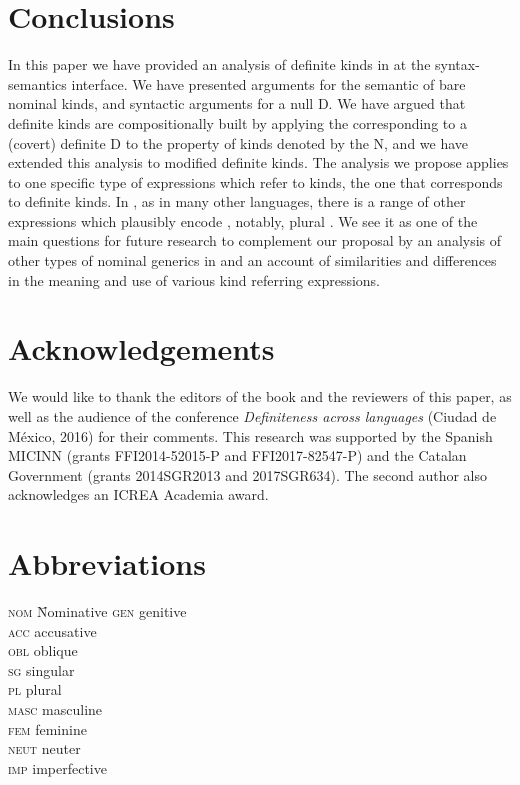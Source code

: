 \documentclass[output=paper
,modfonts
,nonflat]{langsci/langscibook}
\begin{document}
	\section{Conclusions}\label{sec:borik:4}
	
	In this paper we have provided an analysis of definite kinds in  at the syntax-semantics interface. We have presented arguments for the semantic  of bare nominal kinds, and syntactic arguments for a null D. We have argued that definite kinds are compositionally built by applying the  corresponding to a (covert) definite D to the property of kinds denoted by the N, and we have extended this analysis to modified definite kinds. The analysis we propose applies to one specific type of expressions which refer to kinds, the one that corresponds to  definite kinds. In , as in many other languages, there is a range of other expressions which plausibly encode , notably, plural . We see it as one of the main questions for future research to complement our proposal by an analysis of other types of nominal generics in  and an account of similarities and differences in the meaning and use of various kind referring expressions.
	
		
	\section*{Acknowledgements}
	
	We would like to thank the editors of the book and the reviewers of this paper, as well as the audience of the conference \textit{Definiteness across languages} (Ciudad de M\'exico, 2016) for their comments. This research was supported by the Spanish MICINN (grants FFI2014-52015-P and FFI2017-82547-P) and the Catalan Government (grants 2014SGR2013 and 2017SGR634). The second author also acknowledges an ICREA Academia award.
	
	\section*{Abbreviations}
	\begin{multicols}{2}
		\begin{tabbing}
			\textsc{nom}\hspace{1em} \=  Nominative \kill 
			\textsc{gen} \>	genitive \\
			\textsc{acc} \>	accusative \\
			\textsc{obl} \>	oblique \\
			\textsc{sg} \>	singular \\
			\textsc{pl} \>	plural \\
			\textsc{masc} \> masculine \\
			\textsc{fem} \>	feminine \\ %
			\textsc{neut} \> neuter \\
			\textsc{imp} \>	imperfective \\
		\end{tabbing}
	\end{multicols}
	
	{\sloppy
		\printbibliography[heading=subbibliography,notkeyword=this]
	}
\end{document}

